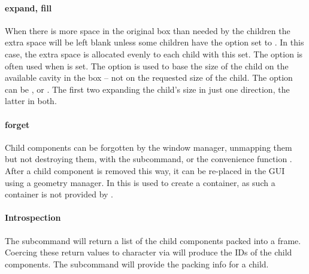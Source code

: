 \paragraph{expand, fill}
When there is more space in the original box than needed by the
children the extra space will be left blank unless some children have
the option  set to . In this case,
the extra space is allocated evenly to each child with this set. The
 option is often used when  is set.  The
 option is used to base the size of the child on
the available cavity in the box -- not on the requested size of the
child. The  option can be ,  or
. The first two expanding the child's size in just one
direction, the latter in both.

\paragraph{forget}
Child components can be forgotten by the window manager, unmapping
them but not destroying them, with the 
subcommand, or the convenience function
. After a child component is removed this way,
it can be re-placed in the GUI using a geometry manager. In
 this is used to create a 
container, as such a container is not provided by \TK.

\paragraph{Introspection}
The subcommand  will return a list of the
child components packed into a frame. Coercing these return values to
character via  will produce the IDs of the child
components. The subcommand  will provide the
packing info for a child.

